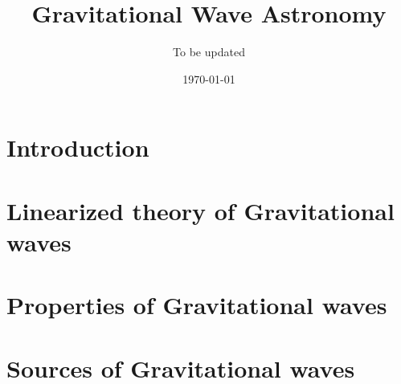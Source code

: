\documentclass[16pt, a4paper]{report}
\title{Gravitational Wave Astronomy}
\author{To be updated}
\date{\today}
\begin{document}
\maketitle

\pagebreak

\pagebreak

\pagebreak
\section{Introduction}




\pagebreak

\pagebreak

\section{Linearized theory of Gravitational waves}


\pagebreak

\section{Properties of Gravitational waves}
 \pagebreak
 \pagebreak
 \pagebreak

\section{Sources of Gravitational waves}




\end{document}
